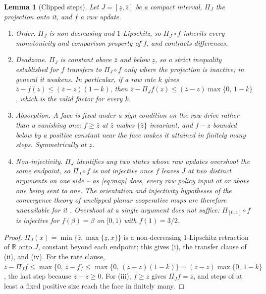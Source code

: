\documentclass[11pt]{article}
\newtheorem{lemma}[theorem]{Lemma}
\theoremstyle{definition}
\theoremstyle{remark}
\numberwithin{equation}{section}
\begin{document}
\begin{lemma}[Clipped steps]\label{lem:clip}
Let $J = [\underline z, \bar z]$ be a compact interval, $\Pi_J$ the projection onto it, and $f$ a raw update.
\begin{enumerate}
\item[(i)] \emph{Order.} $\Pi_J$ is non-decreasing and $1$-Lipschitz, so $\Pi_J \circ f$ inherits every monotonicity and comparison property of $f$, and contracts differences.
\item[(ii)] \emph{Deadzone.} $\Pi_J$ is constant above $\bar z$ and below $\underline z$, so a strict inequality established for $f$ transfers to $\Pi_J \circ f$ only where the projection is inactive; in general it weakens. In particular, if a raw rate $k$ gives $\bar z - f(z) \le (\bar z - z)(1-k)$, then $\bar z - \Pi_J f(z) \le (\bar z - z)\max\{0,\,1-k\}$, which is the valid factor for \emph{every} $k$.
\item[(iii)] \emph{Absorption.} A face is fixed under a sign condition on the raw drive rather than a vanishing one: $f \ge \bar z$ at $\bar z$ makes $\{\bar z\}$ invariant, and $f - z$ bounded below by a positive constant near the face makes it attained in finitely many steps. Symmetrically at $\underline z$.
\item[(iv)] \emph{Non-injectivity.} $\Pi_J$ identifies any two states whose raw updates overshoot the same endpoint, so $\Pi_J \circ f$ is not injective once $f$ leaves $J$ at two distinct arguments on one side -- as \eqref{eq:map} does, every raw policy input at or above one being sent to one. The orientation and injectivity hypotheses of the convergence theory of unclipped planar cooperative maps are therefore unavailable for it \citep{smith1998planar,hirsch2006monotone}. Overshoot at a single argument does not suffice: $\Pi_{[0,1]} \circ f$ is injective for $f(\beta) = \beta$ on $[0,1)$ with $f(1) = 3/2$.
\end{enumerate}
\end{lemma}
\begin{proof}
$\Pi_J(x) = \min\{\bar z, \max\{\underline z, x\}\}$ is a non-decreasing $1$-Lipschitz retraction of $\mathbb{R}$ onto $J$, constant beyond each endpoint; this gives (i), the transfer clause of (ii), and (iv). For the rate clause, $\bar z - \Pi_J f \le \max\{0,\,\bar z - f\} \le \max\{0,\,(\bar z - z)(1-k)\} = (\bar z - z)\max\{0,\,1-k\}$, the last step because $\bar z - z \ge 0$. For (iii), $f \ge \bar z$ gives $\Pi_J f = \bar z$, and steps of at least a fixed positive size reach the face in finitely many.
\end{proof}
\end{document}
